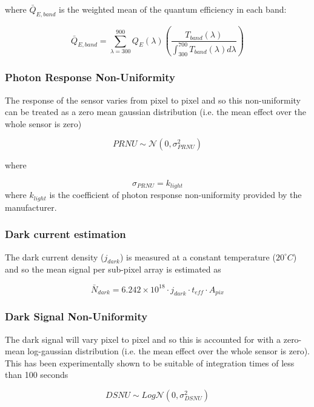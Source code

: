 \documentclass[10pt,a4paper,final,twocolumn]{article}
\begin{document}
where $\bar{Q}_{E,band}$ is the weighted mean of the quantum efficiency in each band:

\begin{equation}
\bar{Q}_{E, band} = \sum_{\lambda=300}^{900} Q_{E}(\lambda) \left(\frac{T_{band}(\lambda)}{\int_{300}^{700} T_{band}(\lambda) d\lambda}\right)
\end{equation}

\subsubsection{Photon Response Non-Uniformity}
The response of the sensor varies from pixel to pixel and so this non-uniformity can be treated as a zero mean gaussian distribution (i.e. the mean effect over the whole sensor is zero)

\begin{equation}
PRNU \sim \mathcal{N}(0, \sigma_{PRNU}^{2})
\end{equation}

where

\begin{equation}
\sigma_{PRNU} = k_{light}
\end{equation}
 where $k_{light}$ is the coefficient of photon response non-uniformity provided by the manufacturer.
 
\subsubsection{Dark current estimation}
The dark current density ($j_{dark}$) is measured at a constant temperature ($20^{\circ} C$) and so the mean signal per sub-pixel array is estimated as

\begin{equation}
\bar{N}_{dark} = 6.242 \times 10^{18} \cdot j_{dark} \cdot t_{eff} \cdot A_{pix}
\end{equation}

\subsubsection{Dark Signal Non-Uniformity}
The dark signal will vary pixel to pixel and so this is accounted for with a zero-mean log-gaussian distribution (i.e. the mean effect over the whole sensor is zero). This has been experimentally shown to be suitable of integration times of less than 100 seconds

\begin{equation}
DSNU \sim Log\mathcal{N}(0, \sigma_{DSNU}^{2})
\end{equation}
\end{document}
